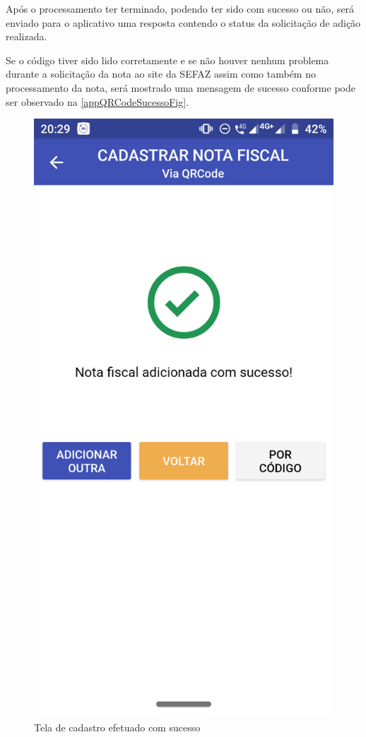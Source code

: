 \begin{figure}[h]
    \label{appQRCodeLoadingFig}
\end{figure}

\newpage
Após o processamento ter terminado, podendo ter sido com sucesso ou não, será enviado para o aplicativo uma resposta contendo o status da solicitação de adição realizada.

Se o código tiver sido lido corretamente e se não houver nenhum problema durante a solicitação da nota ao site da SEFAZ assim como também no processamento da nota, será mostrado uma mensagem de sucesso conforme pode ser observado na \autoref{appQRCodeSucessoFig}.

\begin{figure}[h]
    \centering
    \caption{Tela de cadastro efetuado com sucesso}
    \includegraphics[scale=0.15]{tcc/figures/app/app_codigo_qrcode_sucesso.png}

\end{figure}
